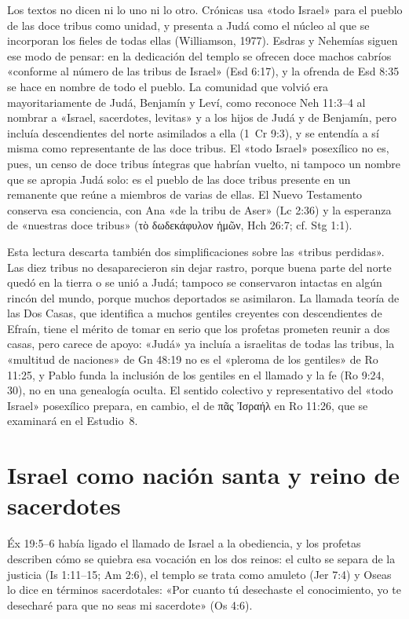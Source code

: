 \documentclass[11pt,letterpaper]{article}
\newcommand{\grc}[1]{\foreignlanguage{ancientgreek}{#1}}
\begin{document}
Los textos no dicen ni lo uno ni lo otro. Crónicas usa «todo Israel» para el pueblo de las doce tribus como unidad, y presenta a Judá como el núcleo al que se incorporan los fieles de todas ellas (Williamson, 1977). Esdras y Nehemías siguen ese modo de pensar: en la dedicación del templo se ofrecen doce machos cabríos «conforme al número de las tribus de Israel» (Esd 6:17), y la ofrenda de Esd 8:35 se hace en nombre de todo el pueblo. La comunidad que volvió era mayoritariamente de Judá, Benjamín y Leví, como reconoce Neh 11:3--4 al nombrar a «Israel, sacerdotes, levitas» y a los hijos de Judá y de Benjamín, pero incluía descendientes del norte asimilados a ella (1~Cr 9:3), y se entendía a sí misma como representante de las doce tribus. El «todo Israel» posexílico no es, pues, un censo de doce tribus íntegras que habrían vuelto, ni tampoco un nombre que se apropia Judá solo: es el pueblo de las doce tribus presente en un remanente que reúne a miembros de varias de ellas. El Nuevo Testamento conserva esa conciencia, con Ana «de la tribu de Aser» (Lc 2:36) y la esperanza de «nuestras doce tribus» (\grc{τὸ δωδεκάφυλον ἡμῶν}, Hch 26:7; cf. Stg 1:1).

Esta lectura descarta también dos simplificaciones sobre las «tribus perdidas». Las diez tribus no desaparecieron sin dejar rastro, porque buena parte del norte quedó en la tierra o se unió a Judá; tampoco se conservaron intactas en algún rincón del mundo, porque muchos deportados se asimilaron. La llamada teoría de las Dos Casas, que identifica a muchos gentiles creyentes con descendientes de Efraín, tiene el mérito de tomar en serio que los profetas prometen reunir a dos casas, pero carece de apoyo: «Judá» ya incluía a israelitas de todas las tribus, la «multitud de naciones» de Gn 48:19 no es el «pleroma de los gentiles» de Ro 11:25, y Pablo funda la inclusión de los gentiles en el llamado y la fe (Ro 9:24, 30), no en una genealogía oculta. El sentido colectivo y representativo del «todo Israel» posexílico prepara, en cambio, el de \grc{πᾶς Ἰσραήλ} en Ro 11:26, que se examinará en el Estudio~8.

\section{Israel como nación santa y reino de sacerdotes}

Éx 19:5--6 había ligado el llamado de Israel a la obediencia, y los profetas describen cómo se quiebra esa vocación en los dos reinos: el culto se separa de la justicia (Is 1:11--15; Am 2:6), el templo se trata como amuleto (Jer 7:4) y Oseas lo dice en términos sacerdotales: «Por cuanto tú desechaste el conocimiento, yo te desecharé para que no seas mi sacerdote» (Os 4:6).
\end{document}
